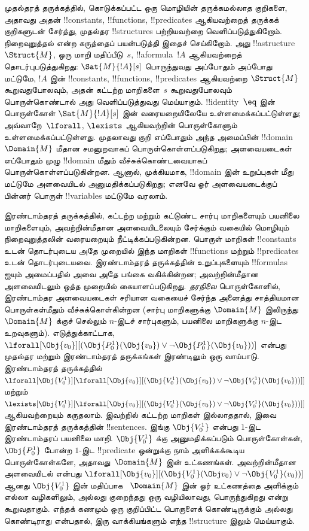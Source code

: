 \documentclass[../../../include/open-logic-section]{subfiles}
\begin{document}



முதல்தரத் தருக்கத்தில், கொடுக்கப்பட்ட ஒரு மொழியின் தருக்கமல்லாத
குறிகளை, அதாவது அதன் !!{constant}s, !!{function}s, !!{predicate}s
ஆகியவற்றைத் தருக்கக் குறிகளுடன் சேர்த்து, முதல்தர
!!{structure}s பற்றியவற்றை வெளிப்படுத்துகிறோம். நிறைவுறுத்தல் என்ற
கருத்தைப் பயன்படுத்தி இதைச் செய்கிறோம். அது !!a{structure}~$\Struct{M}$,
ஒரு மாறி மதிப்பீடு~$s$, !!a{formula}~$!A$ ஆகியவற்றைத் தொடர்புபடுத்துகிறது:
$\Sat{M}{!A}[s]$ பொருந்துவது அப்போதும் அப்போது மட்டுமே, $!A$ இன்
!!{constant}s, !!{function}s, !!{predicate}s ஆகியவற்றை
$\Struct{M}$ கூறுவதுபோலவும், அதன் கட்டற்ற மாறிகளை~$s$ கூறுவதுபோலவும்
பொருள்கொண்டால் அது வெளிப்படுத்துவது மெய்யாகும். !!{identity}~$\eq$ இன்
பொருள்கோள் $\Sat{M}{!A}[s]$ இன் வரையறையிலேயே உள்ளமைக்கப்பட்டுள்ளது;
அவ்வாறே~$\lforall$, $\lexists$ ஆகியவற்றின் பொருள்கோளும்
உள்ளமைக்கப்பட்டுள்ளது. முதலாவது குறி எப்போதும் அந்த அமைப்பின்
!!{domain}~$\Domain{M}$ மீதான சமனுறவாகப் பொருள்கொள்ளப்படுகிறது;
அளவையடைகள் எப்போதும் முழு !!{domain} மீதும் வீச்சுக்கொண்டவையாகப்
பொருள்கொள்ளப்படுகின்றன. ஆனால், முக்கியமாக, !!{domain} இன் உறுப்புகள்
மீது மட்டுமே அளவையிடல் அனுமதிக்கப்படுகிறது; எனவே ஓர் அளவையடைக்குப்
பின்னர் பொருள் !!{variable}s மட்டுமே வரலாம்.

இரண்டாம்தரத் தருக்கத்தில், கட்டற்ற மற்றும் கட்டுண்ட சார்பு மாறிகளையும்
பயனிலை மாறிகளையும், அவற்றின்மீதான அளவையிடலையும் சேர்க்கும் வகையில்
மொழியும் நிறைவுறுத்தலின் வரையறையும் நீட்டிக்கப்படுகின்றன. பொருள்
மாறிகள் !!{constant}s உடன் தொடர்புடைய அதே முறையில் இந்த மாறிகள்
!!{function}s மற்றும் !!{predicate}s உடன் தொடர்புடையவை. இரண்டாம்தரத்
தருக்கத்தின் உறுப்புகளையும் !!{formula}s ஐயும் அமைப்பதில் அவை அதே
பங்கை வகிக்கின்றன; அவற்றின்மீதான அளவையிடலும் ஒத்த முறையில்
கையாளப்படுகிறது. \emph{தரநிலை} பொருள்கோளில், இரண்டாம்தர அளவையடைகள்
சரியான வகையைச் சேர்ந்த அனைத்து சாத்தியமான பொருள்கள்மீதும்
வீச்சுக்கொள்கின்றன (சார்பு மாறிகளுக்கு $\Domain{M}$ இலிருந்து
~$\Domain{M}$ க்குச் செல்லும் $n$-இடச் சார்புகளும், பயனிலை
மாறிகளுக்கு $n$-இட உறவுகளும்). எடுத்துக்காட்டாக,
$\lforall[\Obj{v_0}][(\Obj{P^1_0}(\Obj{v_0}) \lor \lnot
  \Obj{P^1_0}(\Obj{v_0}))]$ என்பது முதல்தர மற்றும் இரண்டாம்தரத்
தருக்கங்கள் இரண்டிலும் ஒரு வாய்பாடு. இரண்டாம்தரத் தருக்கத்தில்
$\lforall[\Obj{V^1_0}][\lforall[\Obj{v_0}][(\Obj{V^1_0}(\Obj{v_0}) \lor
    \lnot \Obj{V^1_0}(\Obj{v_0}))]]$ மற்றும்
$\lexists[\Obj{V^1_0}][\lforall[\Obj{v_0}][(\Obj{V^1_0}(\Obj{v_0}) \lor
    \lnot \Obj{V^1_0}(\Obj{v_0}))]]$ ஆகியவற்றையும் கருதலாம்.
இவற்றில் கட்டற்ற மாறிகள் இல்லாததால், இவை இரண்டாம்தரத் தருக்கத்தின்
!!{sentence}s. இங்கு $\Obj{V^1_0}$ என்பது $1$-இட இரண்டாம்தரப் பயனிலை
மாறி. $\Obj{V^1_0}$ க்கு அனுமதிக்கப்படும் பொருள்கோள்கள்,
$\Obj{P^1_0}$ போன்ற $1$-இட !!{predicate} ஒன்றுக்கு நாம் அளிக்கக்கூடிய
பொருள்கோள்களே, அதாவது~$\Domain{M}$ இன் உட்கணங்கள். அவற்றின்மீதான
அளவையிடல் என்பது
$\lforall[\Obj{v_0}][(\Obj{V^1_0}(\Obj v_0) \lor \lnot
  \Obj{V^1_0}(v_0))]$ ஆனது $\Obj{V^1_0}$ இன் மதிப்பாக
~$\Domain{M}$ இன் ஓர் உட்கணத்தை அளிக்கும் எல்லா வழிகளிலும், அல்லது
குறைந்தது ஒரு வழியிலாவது, பொருந்துகிறது என்று கூறுவதாகும். எந்தக்
கணமும் ஒரு குறிப்பிட்ட பொருளைக் கொண்டிருக்கும் அல்லது கொண்டிராது
என்பதால், இரு வாக்கியங்களும் எந்த !!{structure} இலும் மெய்யாகும்.
\end{document}
